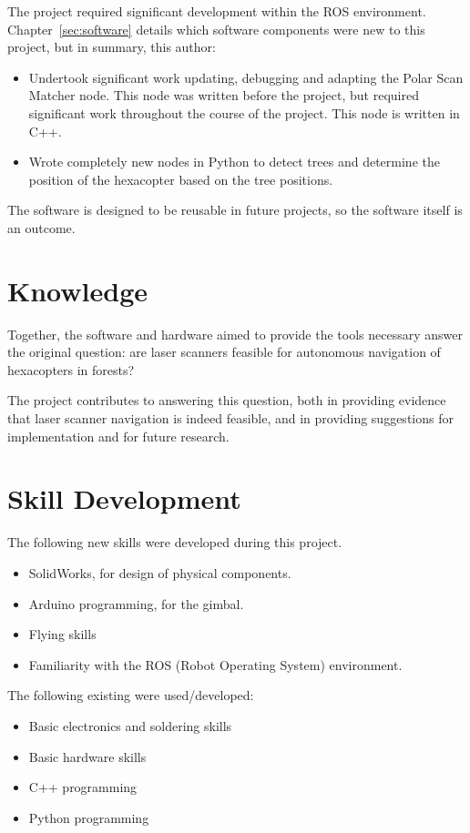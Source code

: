 \documentclass[12pt,oneside,a4paper]{book}
\begin{document}
The project required significant development within the ROS
environment. Chapter~\ref{sec:software} details which software
components were new to this project, but in summary, this author:
\begin{itemize}
\item Undertook significant work updating, debugging and adapting the
  Polar Scan Matcher node. This node was written before the project,
  but required significant work throughout the course of the
  project. This node is written in C++.
\item Wrote completely new nodes in Python to detect trees and
  determine the position of the hexacopter based on the tree
  positions.
\end{itemize}

The software is designed to be reusable in future projects, so the
software itself is an outcome.

\section{Knowledge}
\label{sec:knowledge}

Together, the software and hardware aimed to provide the tools
necessary answer the original question: are laser scanners feasible
for autonomous navigation of hexacopters in forests?

The project contributes to answering this question, both in providing
evidence that laser scanner navigation is indeed feasible, and in
providing suggestions for implementation and for future research.

\section{Skill Development}
\label{sec:skill-development}

The following new skills were developed during this project.

\begin{itemize}
\item SolidWorks, for design of physical components.
\item Arduino programming, for the gimbal.
\item Flying skills
\item Familiarity with the ROS (Robot Operating System) environment.
 \end{itemize}
 
The following existing were used/developed:
\begin{itemize}
\item Basic electronics and soldering skills
\item Basic hardware skills
\item C++ programming
\item Python programming
\end{itemize}
\end{document}
